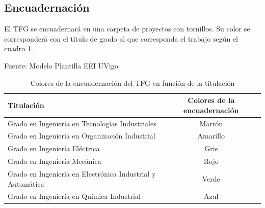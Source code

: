     \subsection{Encuadernación}
        El TFG se encuadernará en una carpeta de proyectos con tornillos. Su color se corresponderá con el título de grado al que corresponda el trabajo según el cuadro  \ref{tab: Colores de la encuadernación del TFG en función de la titulación}. 

        \begin{table}[H]
            \centering
            \caption{Colores de la encuadernación del TFG en función de la titulación}
            \label{tab: Colores de la encuadernación del TFG en función de la titulación}
            {Fuente: Modelo Plantilla EEI UVigo}
            \begin{tabular}{l c}
                \textbf{Titulación} & \textbf{Colores de la encuadernación} \\ \hline
                Grado en Ingeniería en Tecnologías Industriales & Marrón \\
                Grado en Ingeniería en Organización Industrial & Amarillo \\
                Grado en Ingeniería Eléctrica & Gris \\
                Grado en Ingeniería Mecánica & Rojo \\
                Grado en Ingeniería en Electrónica Industrial y Automática & Verde \\
                Grado en Ingeniería en Química Industrial & Azul \\ \hline
            \end{tabular}
            
        \end{table}